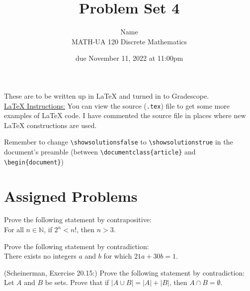 \documentclass{article}
\title{Problem Set 4}
\author{%
    Name
\\  MATH-UA 120 Discrete Mathematics
}
\date{due November 11, 2022 at 11:00pm}
\newif\ifshowsolutions
\newcommand{\danger}{\marginpar[\hfill\dbend]{\dbend\hfill}}
\theoremstyle{definition}
\begin{document}
\maketitle



These are to be written up in \LaTeX{} and turned in to Gradescope.\\



\ifshowsolutions
    \SetupExSheets{solution/print=true}
\else
    \danger
 \underline{ \LaTeX{}  Instructions:}  You can view the source (\texttt{.tex}) file to get some more examples of \LaTeX{} code.  I have commented the source file in places where new \LaTeX{} constructions are used.
  
  Remember to change \verb|\showsolutionsfalse| to \verb|\showsolutionstrue|
    in the document's preamble 
    (between \verb|\documentclass{article}| and \verb|\begin{document}|)
\fi

\section*{Assigned Problems}

\begin{question}
    Prove the following statement by contrapositive: \\
    For all $n\in \mathbb{N}$, if $2^n<n!$, then $n>3$.
\end{question}
\begin{solution}
\end{solution}


\begin{question}
    Prove the following statement by contradiction:\\
    There exists no integers $a$ and $b$ for which $21a + 30b = 1$.
\end{question}
\begin{solution}
\end{solution}




\begin{question}
    (Scheinerman, Exercise 20.15:)
    Prove the following statement by contradiction:\\ Let $A$ and $B$ be sets.  Prove that if $|A \cup B| = |A| + |B|$, then $A\cap B = \emptyset$.
\end{question}
\begin{solution}
\end{solution}
\end{document}

